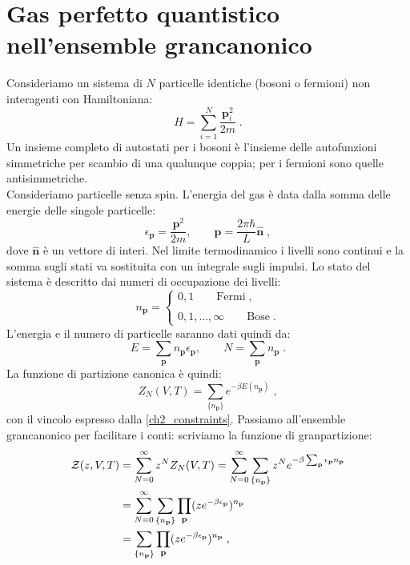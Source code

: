 \documentclass[10pt,a4paper]{report}
\theoremstyle{definition}
\numberwithin{equation}{section}
\newcommand{\zpart}{\mathcal{Z}}
\begin{document}
\section{Gas perfetto quantistico nell'ensemble grancanonico}
Consideriamo un sistema di $N$ particelle identiche (bosoni o fermioni) non interagenti con Hamiltoniana:
\begin{equation}
H=\sum_{i=1}^N\frac{\mathbf{p}_i^2}{2m}\;.
\end{equation}
Un insieme completo di autostati per i bosoni è l'insieme delle autofunzioni simmetriche per scambio di una qualunque coppia; per i fermioni sono quelle antisimmetriche. \\
Consideriamo particelle senza spin. L'energia del gas è data dalla somma delle energie delle singole particelle:
\begin{equation}
\epsilon_{\mathbf{p}}=\frac{\mathbf{p}^2}{2m},\qquad \mathbf{p}=\frac{2\pi \hbar}{L}\hat{\mathbf{n}}\;,
\end{equation}
dove $\hat{\mathbf{n}}$ è un vettore di interi. Nel limite termodinamico i livelli sono continui e la somma sugli stati va sostituita con un integrale sugli impulsi. Lo stato del sistema è descritto dai numeri di occupazione dei livelli:
\begin{equation}
n_{\mathbf{p}}=\begin{cases}
0,1\qquad \mbox{Fermi}\;, \\
\\
0,1,\ldots,\infty\qquad \mbox{Bose}\;.
\end{cases}
\end{equation}
L'energia e il numero di particelle saranno dati quindi da:
\begin{equation}
E=\sum_{\mathbf{p}}n_{\mathbf{p}}\epsilon_{\mathbf{p}},\qquad N=\sum_{\mathbf{p}}n_{\mathbf{p}}\;. \label{ch2_constraints}
\end{equation}
La funzione di partizione canonica è quindi:
\begin{equation}
Z_N(V,T)=\sum_{\{n_{\mathbf{p}}\}}e^{-\beta E(n_{\mathbf{p}})}\;,
\end{equation}
con il vincolo espresso dalla \eqref{ch2_constraints}. Passiamo all'ensemble grancanonico per facilitare i conti: scriviamo la funzione di granpartizione:
\begin{align}
\zpart(z,V,T) &= \sum_{N=0}^{\infty} z^NZ_N(V,T)=\sum_{N=0}^{\infty}\sum_{\{n_{\mathbf{p}}\}}z^Ne^{-\beta\sum_{\mathbf{p}}\epsilon_{\mathbf{p}}n_{\mathbf{p}}}\notag \\
&=\sum_{N=0}^{\infty}\sum_{\{n_{\mathbf{p}}\}}\prod_{\mathbf{p}}(ze^{-\beta\epsilon_{\mathbf{p}}})^{n_{\mathbf{p}}} \notag \\
&= \sum_{\{n_{\mathbf{p}}\}}\prod_{\mathbf{p}}(ze^{-\beta\epsilon_{\mathbf{p}}})^{n_{\mathbf{p}}}\;,
\end{align}
\end{document}
